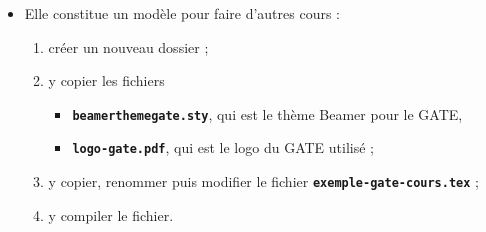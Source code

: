   \begin{itemize}
  \item Elle constitue un modèle pour faire d'autres cours :
    
    \begin{enumerate}
    \item créer un nouveau dossier ;
    \item y copier les fichiers 
      
      \begin{itemize}
      \item \texttt{\textbf{beamerthemegate.sty}}, qui est le thème Beamer pour le GATE,
      \item \texttt{\textbf{logo-gate.pdf}}, qui est le logo du GATE utilisé ;
      \end{itemize}
      
    \item y copier, renommer puis modifier le fichier \texttt{\textbf{exemple-gate-cours.tex}} ;
    \item y compiler le fichier.
    \end{enumerate}
  \end{itemize}
